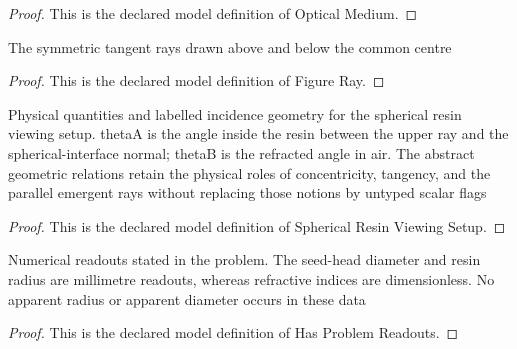 \begin{proof}
  This is the declared model definition of Optical Medium.
\end{proof}
\begin{definition}
  \label{def:physics:phyx-mini-0106:phyxminiproblems-problemphyxmini0106-figureray}
  The symmetric tangent rays drawn above and below the common centre
\end{definition}
\begin{proof}
  This is the declared model definition of Figure Ray.
\end{proof}
\begin{definition}
  \label{def:physics:phyx-mini-0106:phyxminiproblems-problemphyxmini0106-sphericalresinviewingsetup}
  Physical quantities and labelled incidence geometry for the spherical resin viewing setup. thetaA is the angle inside the resin between the upper ray and the spherical-interface normal; thetaB is the refracted angle in air. The abstract geometric relations retain the physical roles of concentricity, tangency, and the parallel emergent rays without replacing those notions by untyped scalar flags
\end{definition}
\begin{proof}
  This is the declared model definition of Spherical Resin Viewing Setup.
\end{proof}
\begin{definition}
  \label{def:physics:phyx-mini-0106:phyxminiproblems-problemphyxmini0106-hasproblemreadouts}
  Numerical readouts stated in the problem. The seed-head diameter and resin radius are millimetre readouts, whereas refractive indices are dimensionless. No apparent radius or apparent diameter occurs in these data
\end{definition}
\begin{proof}
  This is the declared model definition of Has Problem Readouts.
\end{proof}
